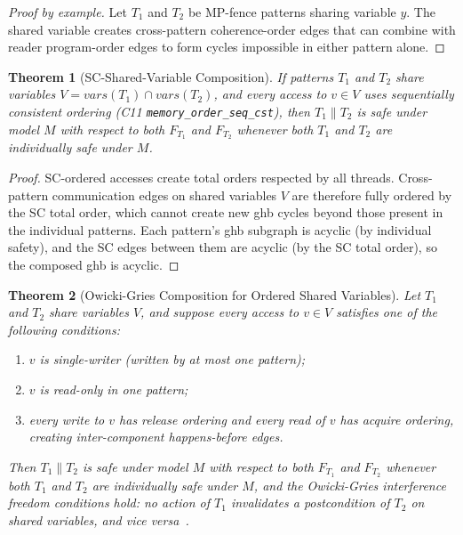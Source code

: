 \documentclass[11pt]{article}
\newtheorem{theorem}{Theorem}
\begin{document}
\begin{proof}[Proof by example]
Let $T_1$ and $T_2$ be MP-fence patterns sharing variable $y$. The
shared variable creates cross-pattern coherence-order edges that can
combine with reader program-order edges to form cycles impossible in
either pattern alone.
\end{proof}

\begin{theorem}[SC-Shared-Variable Composition]
\label{thm:sc-composition}
If patterns $T_1$ and $T_2$ share variables $V = \mathit{vars}(T_1)
\cap \mathit{vars}(T_2)$, and every access to $v \in V$ uses
sequentially consistent ordering (C11 \texttt{memory\_order\_seq\_cst}),
then $T_1 \| T_2$ is safe under model $M$ with respect to both
$F_{T_1}$ and $F_{T_2}$ whenever both $T_1$ and $T_2$ are individually
safe under $M$.
\end{theorem}

\begin{proof}
SC-ordered accesses create total orders respected by all threads.
Cross-pattern communication edges on shared variables $V$ are therefore
fully ordered by the SC total order, which cannot create new ghb cycles
beyond those present in the individual patterns. Each pattern's ghb
subgraph is acyclic (by individual safety), and the SC edges between
them are acyclic (by the SC total order), so the composed ghb is acyclic.
\end{proof}

\begin{theorem}[Owicki-Gries Composition for Ordered Shared Variables]
\label{thm:og-composition}
Let $T_1$ and $T_2$ share variables $V$, and suppose every access to
$v \in V$ satisfies one of the following conditions:
\begin{enumerate}[nosep]
\item $v$ is single-writer (written by at most one pattern);
\item $v$ is read-only in one pattern;
\item every write to $v$ has release ordering and every read of $v$ has
  acquire ordering, creating inter-component happens-before edges.
\end{enumerate}
Then $T_1 \| T_2$ is safe under model $M$ with respect to both
$F_{T_1}$ and $F_{T_2}$ whenever both $T_1$ and $T_2$ are individually
safe under $M$, and the Owicki-Gries interference freedom conditions
hold: no action of $T_1$ invalidates a postcondition of $T_2$
on shared variables, and vice versa~\cite{OwickiGries1976}.
\end{theorem}
\end{document}

